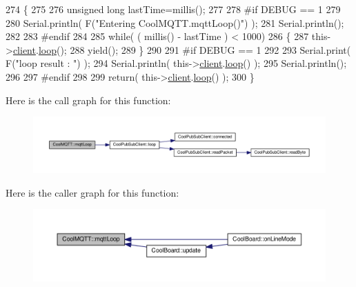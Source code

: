 \begin{DoxyCode}
274 \{
275 
276     \textcolor{keywordtype}{unsigned} \textcolor{keywordtype}{long} lastTime=millis();
277 
278 \textcolor{preprocessor}{#if DEBUG == 1}
279 
280     Serial.println( F(\textcolor{stringliteral}{"Entering CoolMQTT.mqttLoop()"}) );
281     Serial.println();
282 
283 \textcolor{preprocessor}{#endif  }
284 
285     \textcolor{keywordflow}{while}( ( millis() - lastTime ) < 1000)
286     \{
287         this->\hyperlink{class_cool_m_q_t_t_afed1372683c44893b4668d0f1771f514}{client}.\hyperlink{class_cool_pub_sub_client_afc15900f0fc4886a19394508e61793b8}{loop}();
288         yield();
289     \}
290 
291 \textcolor{preprocessor}{#if DEBUG == 1 }
292     
293     Serial.print( F(\textcolor{stringliteral}{"loop result : "}) );
294     Serial.println( this->\hyperlink{class_cool_m_q_t_t_afed1372683c44893b4668d0f1771f514}{client}.\hyperlink{class_cool_pub_sub_client_afc15900f0fc4886a19394508e61793b8}{loop}() );
295     Serial.println();
296 
297 \textcolor{preprocessor}{#endif}
298 
299     \textcolor{keywordflow}{return}( this->\hyperlink{class_cool_m_q_t_t_afed1372683c44893b4668d0f1771f514}{client}.\hyperlink{class_cool_pub_sub_client_afc15900f0fc4886a19394508e61793b8}{loop}() );
300 \}
\end{DoxyCode}
Here is the call graph for this function\+:\nopagebreak
\begin{figure}[H]
\begin{center}
\leavevmode
\includegraphics[width=350pt]{d0/dd0/class_cool_m_q_t_t_aa5eaae967b562b62cbcf2b8d81f6e5d5_cgraph}
\end{center}
\end{figure}
Here is the caller graph for this function\+:\nopagebreak
\begin{figure}[H]
\begin{center}
\leavevmode
\includegraphics[width=350pt]{d0/dd0/class_cool_m_q_t_t_aa5eaae967b562b62cbcf2b8d81f6e5d5_icgraph}
\end{center}
\end{figure}
\mbox{\label{class_cool_m_q_t_t_a40553a0ad4b5ecf1cb4411ab54ca85fb}} 
